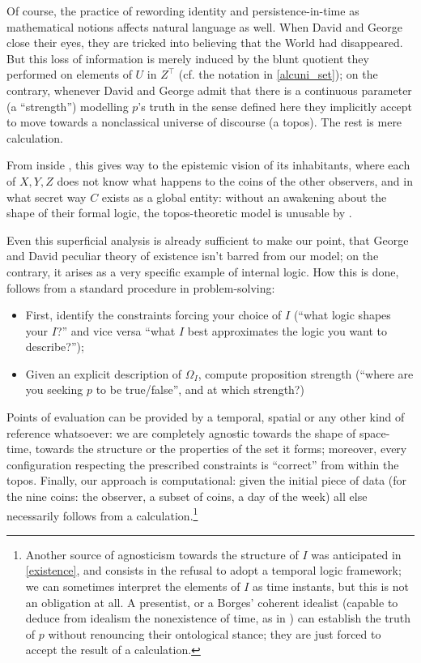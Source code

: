 Of course, the practice of rewording identity and persistence-in-time as mathematical notions affects natural language as well. When David and George close their eyes, they are tricked into believing that the World had disappeared. But this loss of information is merely induced by the blunt quotient they performed on elements of $U$ in $Z^\top$ (cf. the notation in \autoref{alcuni_set}); on the contrary, whenever David and George admit that there is a continuous parameter (a ``strength'') modelling $p$'s truth in the sense defined here they implicitly accept to move towards a nonclassical universe of discourse (a topos). The rest is mere calculation.

From inside \tlon, this gives way to the epistemic vision of its inhabitants, where each of $X,Y,Z$ does not know what happens to the coins of the other observers, and in what secret way $C$ exists as a global entity: without an awakening about the shape of their formal logic, the topos-theoretic model is unusable by \tlonians.

Even this superficial analysis is already sufficient to make our point, that George and David peculiar theory of existence isn't barred from our model; on the contrary, it arises as a very specific example of internal logic. How this is done, follows from a standard procedure in problem-solving:
\begin{itemize}
  \item First, identify the constraints forcing your choice of $I$ (``what logic shapes your $I$?'' and vice versa ``what $I$ best approximates the logic you want to describe?'');
  \item Given an explicit description of $\Omega_I$, compute proposition strength (``where are you seeking $p$ to be true/false'', and at which strength?)
\end{itemize}
Points of evaluation can be provided by a temporal, spatial or any other kind of reference whatsoever: we are completely agnostic towards the shape of space-time, towards the structure or the properties of the set it forms; moreover, every configuration respecting the prescribed constraints is ``correct'' from within the topos. Finally, our approach is computational: given the initial piece of data (for the nine coins: the observer, a subset of coins, a day of the week) all else necessarily follows from a calculation.\footnote{Another source of agnosticism towards the structure of $I$ was anticipated in \autoref{existence}, and consists in the refusal to adopt a temporal logic framework; we can sometimes interpret the elements of $I$ as time instants, but this is not an obligation at all. A presentist, or a Borges' coherent idealist (capable to deduce from idealism the nonexistence of time, as in \cite{confutacion}) can establish the truth of $p$ without renouncing their ontological stance; they are just forced to accept the result of a calculation.}

